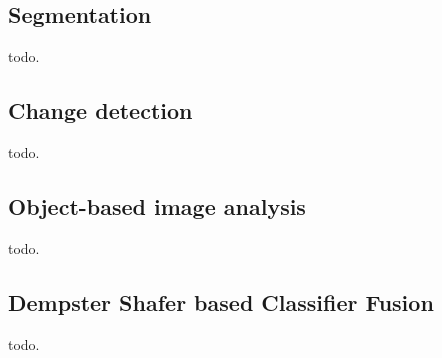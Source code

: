 \subsection{Segmentation}\label{ssec:segmentation}

todo.

\subsection{Change detection}\label{ssec:changedetection}

todo.

\subsection{Object-based image analysis}\label{ssec:obia}

todo.

\subsection{Dempster Shafer based Classifier Fusion}\label{ssec:classifierfusion}

todo.

